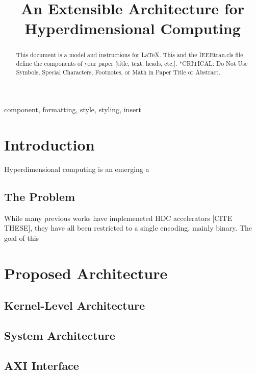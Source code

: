 \documentclass[conference]{IEEEtran}
\begin{document}
\title{An Extensible Architecture for Hyperdimensional Computing}

\author{
}

\maketitle

\begin{abstract}
This document is a model and instructions for \LaTeX.
This and the IEEEtran.cls file define the components of your paper [title, text, heads, etc.]. *CRITICAL: Do Not Use Symbols, Special Characters, Footnotes, 
or Math in Paper Title or Abstract.
\end{abstract}

\begin{IEEEkeywords}
component, formatting, style, styling, insert
\end{IEEEkeywords}

\section{Introduction}

Hyperdimensional computing is an emerging a

\subsection{The Problem}

While many previous works have implemeneted HDC accelerators [CITE THESE], they have all been restricted to a single encoding, mainly binary. The goal of this 

\section{Proposed Architecture}

\subsection{Kernel-Level Architecture}

\subsection{System Architecture}

\subsection{AXI Interface}
\end{document}
